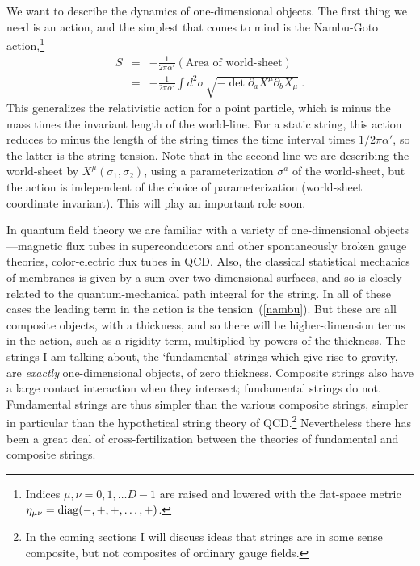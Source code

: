 We want to describe the dynamics of one-dimensional objects.  The
first thing we need is an action, and the simplest that comes to
mind is the Nambu-Goto action,\footnote
{Indices $\mu, \nu = 0, 1, \ldots D-1$ are raised and lowered with the
flat-space metric $\eta_{\mu\nu} = {\rm diag}(-,+,+,\ldots,+)$.}
\begin{eqnarray}
S &=& -\frac{1}{2\pi \alpha'} (\mbox{Area of world-sheet})
\nonumber\\
&=& -\frac{1}{2\pi \alpha'} \int d^2 \sigma \,
\sqrt{ -\det \partial_a X^\mu \partial_b X_\mu }\ . \label{nambu}
\end{eqnarray} 
This generalizes the relativistic action for a point particle,
which is minus the mass times the invariant length of the
world-line.  For a static string, this action reduces to minus the
length of the string times the time interval times $1/2\pi \alpha'$,
so the latter is the string tension.  Note that in the second line
we are describing the world-sheet by $X^\mu(\sigma_1,\sigma_2)$,
using a parameterization $\sigma^a$ of the world-sheet, but the
action is independent of the choice of parameterization (world-sheet
coordinate invariant).  This will play an important role soon.

In quantum field theory we are familiar with a variety of
one-dimensional objects---magnetic flux tubes in superconductors
and other spontaneously broken gauge theories, color-electric flux
tubes in QCD.  Also, the classical statistical mechanics of
membranes is given by a sum over two-dimensional surfaces, and so is
closely related to the quantum-mechanical path integral for the
string.  In all of these cases the leading term in the action is
the tension~(\ref{nambu}).  But these are all composite
objects, with a thickness, and so there will be higher-dimension
terms in the action, such as a rigidity term, multiplied by powers
of the thickness.  The strings I am talking about, the
`fundamental' strings which give rise to gravity, are {\it exactly}
one-dimensional objects, of zero thickness.  Composite strings also
have a large contact interaction when they intersect; fundamental
strings do not.  Fundamental strings are thus simpler than the various
composite strings, simpler in particular than the hypothetical string
theory of QCD.\footnote{In the coming
sections I will discuss ideas that strings are in some sense
composite, but not composites of ordinary gauge fields.}  Nevertheless
there has been a great deal of cross-fertilization between the
theories of fundamental and composite strings.


